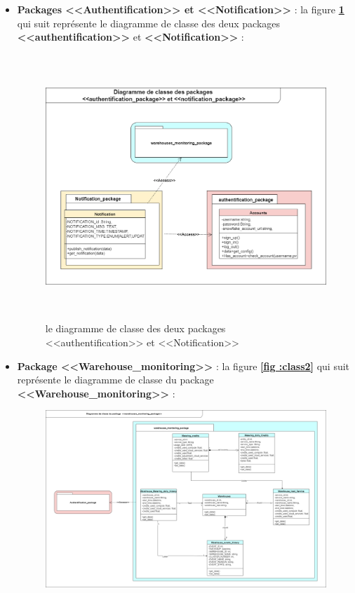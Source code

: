         \begin{itemize}
            \item\textbf{Packages <<Authentification>> et <<Notification>>} : la figure \textbf{\ref{fig :class1}} qui suit représente le diagramme de classe des deux packages \textbf{<<authentification>>} et \textbf{<<Notification>>} : 
            \begin{figure}[H]
                \centering
                \includegraphics[width =0.8\linewidth , height =10cm]{img/conception/class_auth_notif.png}
                \caption{le diagramme de classe des deux packages <<authentification>> et <<Notification>>}
                \label{fig :class1}
                \end{figure}
            \item\textbf{Package <<Warehouse\_monitoring>>} : la figure \textbf{\ref{fig :class2}} qui suit représente le diagramme de classe du package \textbf{<<Warehouse\_monitoring>>} : 
            \begin{figure}[H]
                \centering
                \includegraphics[width =0.8\linewidth]{img/conception/class_warehouse.png}

\end{figure}
\end{itemize}
